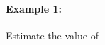 \documentclass[../revisedmain.tex]{subfiles}
\begin{document}
\paragraph{Example 1:}Estimate the value of 
\end{document}

